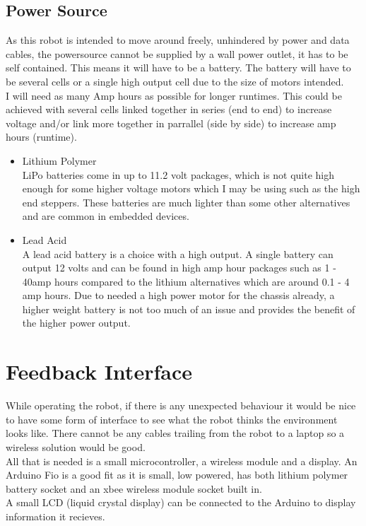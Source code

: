 \subsection{Power Source}
As this robot is intended to move around freely, unhindered by power and data cables, the powersource cannot be supplied by a wall power outlet, it has to be self contained.  This means it will have to be a battery.  The battery will have to be several cells or a single high output cell due to the size of motors intended.
\\I will need as many Amp hours as possible for longer runtimes.  This could be achieved with several cells linked together in series (end to end) to increase voltage and/or link more together in parrallel (side by side) to increase amp hours (runtime).
\begin{itemize}
\item Lithium Polymer
\\LiPo batteries come in up to 11.2 volt packages, which is not quite high enough for some higher voltage motors which I may be using such as the high end steppers.  These batteries are much lighter than some other alternatives and are common in embedded devices.

\item Lead Acid
\\A lead acid battery is a choice with a high output.  A single battery can output 12 volts and can be found in high amp hour packages such as 1 - 40amp hours compared to the lithium alternatives which are around 0.1 - 4 amp hours.  Due to needed a high power motor for the chassis already, a higher weight battery is not too much of an issue and provides the benefit of the higher power output.
\end{itemize}

\section{Feedback Interface}
While operating the robot, if there is any unexpected behaviour it would be nice to have some form of interface to see what the robot thinks the environment looks like.  There cannot be any cables trailing from the robot to a laptop so a wireless solution would be good.
\\All that is needed is a small microcontroller, a wireless module and a display.
An Arduino Fio is a good fit as it is small, low powered, has both lithium polymer battery socket and an xbee wireless module socket built in.
\\A small LCD (liquid crystal display) can be connected to the Arduino to display information it recieves.

